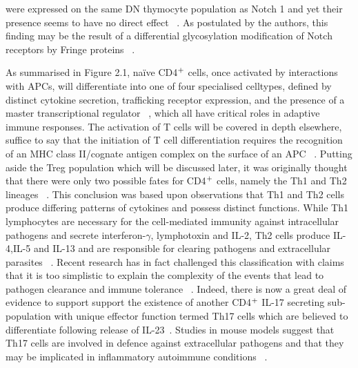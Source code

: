 were expressed on the same DN thymocyte population as Notch 1 and yet their presence seems to have no direct effect ~\autocite{Koya2012}. As postulated by the authors, this finding may be the result of a differential glycosylation modification of Notch receptors by Fringe proteins ~\autocite{Koya2012,Leb2014}.

As summarised in Figure 2.1, na\"ive CD4$\textsuperscript{+}$ cells, once activated by interactions with APCs, will differentiate into one of four specialised celltypes, defined by distinct cytokine secretion, trafficking receptor expression, and the presence of a master transcriptional regulator ~\autocite{Zhu2010}, which all have critical roles in adaptive immune responses. The activation of T cells will be covered in depth elsewhere, suffice to say that the initiation of T cell differentiation requires the recognition of an MHC class II/cognate antigen complex on the surface of an APC ~\autocite{Edw2014}. Putting aside the Treg population which will be discussed later, it was originally thought that there were only two possible fates for CD4$\textsuperscript{+}$ cells, namely the Th1 and Th2 lineages ~\autocite{Awa2009}. This conclusion was based upon observations that Th1 and Th2 cells produce differing patterns of cytokines and possess distinct functions. While Th1 lymphocytes are necessary for the cell-mediated immunity against intracellular pathogens and secrete interferon-$\gamma$, lymphotoxin and IL-2, Th2 cells produce IL-4,IL-5 and IL-13 and are responsible for clearing pathogens and extracellular parasites ~\autocite{Mil2010,Awa2009, Cha2003}. Recent research has in fact challenged this classification with claims that it is too simplistic to explain the complexity of the events that lead to pathogen clearance and immune tolerance ~\autocite{Mil2010}. Indeed, there is now a great deal of evidence to support support the existence of another CD4$\textsuperscript{+}$ IL-17 secreting sub-population with unique effector function termed Th17 cells which are believed to differentiate following release of IL-23~\autocite{Awa2009}. Studies in mouse models suggest that Th17 cells are involved in defence against extracellular pathogens and that they may be implicated in inflammatory autoimmune conditions ~\autocite{Cro2009}. 


